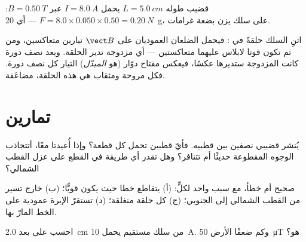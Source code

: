 \begin{example}\label{ex:g11:magnetic-fields:laplace}
قضيب طوله $L = \qty{5.0}{cm}$ يحمل $I = \qty{8.0}{A}$ عبر
$B = \qty{0.50}{T}$: $F = 8.0 \times 0.050 \times 0.50 = \qty{0.20}{N}$
--- أي  \qty{20}{g}، على سلك يزن بضعة غرامات.
\end{example}

\begin{remark}\label{rem:g11:magnetic-fields:motor}
اثنِ السلك حلقةً في : فيحمل الضلعان العموديان على
$\vect B$ تيارين متعاكسين، ومن ثم تكون قوتا لابلاس عليهما متعاكستين
--- أي مزدوجة تدير الحلقة. وبعد نصف دورة كانت المزدوجة ستديرها
عكسًا، فيعكس مفتاح دوّار (هو \emph{المبدّل})
التيار كل نصف دورة. فكل مروحة ومثقاب هي هذه الحلقة، مضاعَفة.
\end{remark}

\section{تمارين}

\begin{exercise}[$\star$]\label{exo:g11:magnetic-fields:1}
يُنشر  قضيبي نصفين بين قطبيه. فأيّ قطبين تحمل كل
قطعة؟ وإذا أُعيدتا معًا، أتتجاذب الوجوه المقطوعة حديثًا
أم تتنافر؟ وهل تقدر أي طريقة في القطع على عزل القطب الشمالي؟
\end{exercise}

\begin{exercise}[$\star$]\label{exo:g11:magnetic-fields:2}
صحيح أم خطأ، مع سبب واحد لكلٍّ: (أ) يتقاطع خطا 
حيث يكون  قويًّا؛ (ب) خارج  تسير 
من القطب الشمالي إلى الجنوبي؛ (ج) كل 
حلقة منغلقة؛ (د) تستقرّ الإبرة عمودية على الخط المارّ بها.
\end{exercise}

\begin{exercise}[$\star$]\label{exo:g11:magnetic-fields:3}
احسب  على بعد \qty{2.0}{cm} من سلك مستقيم يحمل
\qty{10}{A}. وكم ضعفًا  الأرض \qty{50}{\micro T} هو؟
\end{exercise}


